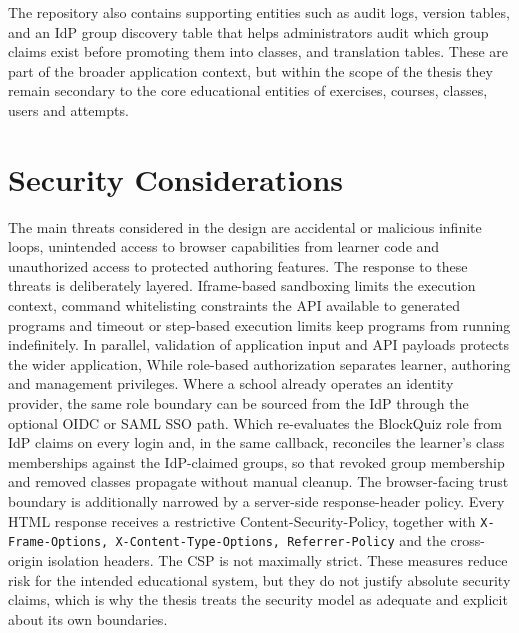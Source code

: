 The repository also contains supporting entities such as audit logs, version tables, and an IdP group 
discovery table that helps administrators audit which group claims exist
before promoting them into classes, and translation tables. These are part of the broader application 
context, but within the scope of the thesis they remain secondary to the core
educational entities of exercises, courses, classes, users and attempts.

\section{Security Considerations}
The main threats considered in the design are accidental or malicious infinite loops,
unintended access to browser capabilities from learner code and unauthorized
access to protected authoring features.
The response to these threats is deliberately layered.
Iframe-based sandboxing limits the execution context, command whitelisting constraints the 
API available to generated programs and timeout or step-based execution
limits keep programs from running indefinitely. In parallel, validation of application input and 
API payloads protects the wider application,
While role-based authorization separates learner, authoring and management privileges.
Where a school already operates an identity provider, the same role boundary can be sourced from the 
IdP through the optional OIDC or SAML SSO path.
Which re-evaluates the BlockQuiz role from IdP claims on every login and, in the same callback, 
reconciles the learner's class memberships against the
IdP-claimed groups, so that revoked group membership and removed classes propagate without manual cleanup.
The browser-facing trust boundary is additionally narrowed by a server-side response-header policy. 
Every HTML response receives a restrictive Content-Security-Policy, together with
\texttt{X-Frame-Options, X-Content-Type-Options, Referrer-Policy} and the cross-origin isolation 
headers. The CSP is not maximally strict.
These measures reduce risk for the intended educational system, but they do not justify absolute 
security claims, which is why the thesis treats the security model as adequate
and explicit about its own boundaries.